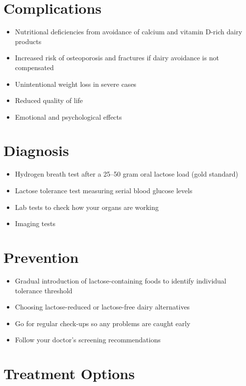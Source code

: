 \section{Complications}

\begin{itemize}[noitemsep]
  \item Nutritional deficiencies from avoidance of calcium and vitamin D-rich dairy products
  \item Increased risk of osteoporosis and fractures if dairy avoidance is not compensated
  \item Unintentional weight loss in severe cases
  \item Reduced quality of life
  \item Emotional and psychological effects
\end{itemize}

\section{Diagnosis}

\begin{itemize}[noitemsep]
  \item Hydrogen breath test after a 25--50 gram oral lactose load (gold standard)
  \item Lactose tolerance test measuring serial blood glucose levels
  \item Lab tests to check how your organs are working
  \item Imaging tests
\end{itemize}

\section{Prevention}

\begin{itemize}[noitemsep]
  \item Gradual introduction of lactose-containing foods to identify individual tolerance threshold
  \item Choosing lactose-reduced or lactose-free dairy alternatives
  \item Go for regular check-ups so any problems are caught early
  \item Follow your doctor's screening recommendations
\end{itemize}

\section{Treatment Options}


